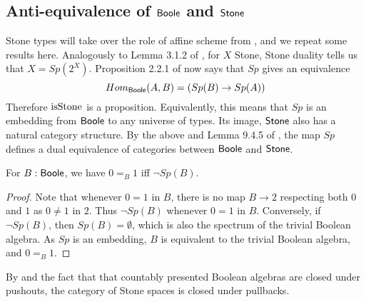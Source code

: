 \subsection{Anti-equivalence of $\mathsf{Boole}$ and $\mathsf{Stone}$}

\begin{remark}\label{SpIsAntiEquivalence}
Stone types will take over the role of affine scheme from \cite{draft}, 
and we repeat some results here. 
Analogously to Lemma 3.1.2 of \cite{draft}, 
for $X$ Stone, Stone duality tells us that $X = Sp(2^X)$. 
%
Proposition 2.2.1 of \cite{draft} now says that 
$Sp$ gives an equivalence 
\begin{equation}
   Hom_{\mathsf{Boole}} (A, B) = (Sp(B) \to Sp(A))
\end{equation}
Therefore $\mathrm{isStone}$ is a proposition.
Equivalently, 
this means that 
$Sp$ is an embedding from $\mathsf{Boole}$ to any universe of types.
Its image, $\mathsf{Stone}$ also has a natural category structure.
By the above and Lemma 9.4.5 of \cite{hott}, 
the map $Sp$ defines a dual equivalence of categories between $\mathsf{Boole}$ and $\mathsf{Stone}$.
\end{remark}

\begin{lemma}\label{SpectrumEmptyIff01Equal}
  For $B:\mathsf{Boole}$, we have $0=_B1$ iff $\neg Sp(B)$.
\end{lemma}
\begin{proof}
  Note that whenever $0=1$ in $B$, there is no map $B\to 2$ respecting both $0$ and $1$ as $0\neq 1$ in $2$. 
  Thus $\neg Sp(B)$ whenever $0=1$ in $B$. 
  Conversely, if $\neg Sp(B)$, then $Sp(B) = \emptyset$, which is also the spectrum of the trivial Boolean algebra. 
  As $Sp$ is an embedding, $B$ is equivalent to the trivial Boolean algebra, and $0=_B1$. 
\end{proof}



\begin{remark}\label{StoneClosedUnderPullback}
  By  and the fact that that countably presented Boolean algebras are closed under pushouts, 
  the category of Stone spaces is closed under pullbacks. 
\end{remark}

